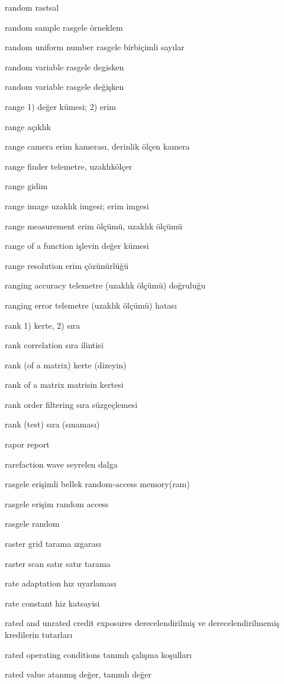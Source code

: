 \documentclass[12pt,fleqn]{article}\usepackage{../../common}
\begin{document}
random rastsal

random sample rasgele örneklem

random uniform number rasgele birbiçimli sayılar

random variable rasgele degisken

random variable rasgele değişken

range 1) değer kümesi; 2) erim

range açıklık

range camera erim kamerası, derinlik ölçen kamera

range finder telemetre, uzaklıkölçer

range gidim

range image uzaklık imgesi; erim imgesi

range measurement erim ölçümü, uzaklık ölçümü

range of a function işlevin değer kümesi

range resolution erim çözünürlüğü

ranging accuracy telemetre (uzaklık ölçümü) doğruluğu

ranging error telemetre (uzaklık ölçümü) hatası

rank 1) kerte, 2) sıra

rank correlation sıra ilintisi

rank (of a matrix) kerte (dizeyin)

rank of a matrix matrisin kertesi

rank order filtering sıra süzgeçlemesi

rank (test) sıra (sınaması)

rapor report

rarefaction wave seyrelen dalga

rasgele erişimli bellek random-access memory(ram)

rasgele erişim random access

rasgele random

raster grid tarama ızgarası

raster scan satır satır tarama

rate adaptation hız uyarlaması

rate constant hiz katsayisi

rated and unrated credit exposures derecelendirilmiş ve derecelendirilmemiş kredilerin tutarları

rated operating conditions tanımlı çalışma koşulları

rated value atanmış değer, tanımlı değer
\end{document}
